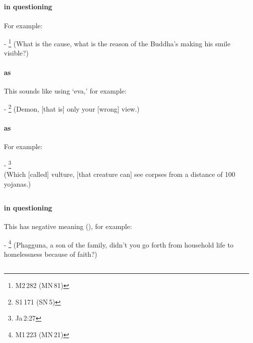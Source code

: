 \subsection*{}\label{nip:nu}
\paragraph*{ in questioning} For example:\par
- \footnote{M2\,282 (MN\,81)} (What is the cause, what is the reason of the Buddha's making his smile visible?) \par
\paragraph*{ as } This sounds like using `eva,' for example:\par
- \footnote{S1\,171 (SN\,5)} (Demon, [that is] only your [wrong] view.) \par
\paragraph*{ as } For example:\par
- \footnote{Ja\,2:27} \\(Which [called] vulture, [that creature can] see corpses from a distance of 100 yojanas.) \par

\subsection*{}\label{nip:nanu}
\paragraph*{ in questioning} This has negative meaning (), for example:\par
- \footnote{M1\,223 (MN\,21)} (Phagguna, a son of the family, didn't you go forth from household life to homelessness because of faith?) \par

\subsection*{}\label{nip:kathadm}
